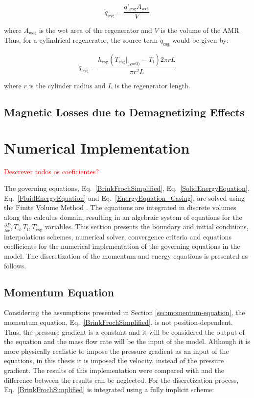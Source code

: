 \documentclass[review,preprint,12pt]{elsarticle}
\begin{document}
\begin{equation}
\dot{q}_\textrm{csg} = \frac{q\textrm{"}_\textrm{csg}A_\textrm{wet}}{V}
\label{Q_csg}
\end{equation}

\noindent where $A_\textrm{wet}$ is the wet area of the regenerator and $V$ is the volume of the AMR. Thus, for a cylindrical regenerator, the source term $\dot{q}_\textrm{csg}$ would be given by:

\begin{equation}
\dot{q}_\textrm{csg} = \frac{ h_\textrm{csg}(T_\textrm{csg}|_\textrm{(y=0)} - T_\textrm{f})2\pi rL}{\pi r^2L}
\label{Q_csg_cylindrical}
\end{equation}

\noindent where $r$ is the cylinder radius and $L$ is the regenerator length.


\subsection{Magnetic Losses due to Demagnetizing Effects}

\section{Numerical Implementation}
\textcolor{red}{Descrever todos os coeficientes?}

The governing equations, Eq.~\eqref{BrinkFrochSimplified}, Eq.~\eqref{SolidEnergyEquation}, Eq.~\eqref{FluidEnergyEquation} and  Eq.~\eqref{EnergyEquation_Casing}, are solved using the Finite Volume Method \cite{Patankar1980,Maliska2004}. The equations are integrated in discrete volumes along the calculus domain, resulting in an algebraic system of equations for the $\frac{\partial P}{\partial x}, T_\textrm{s}, T_\textrm{f}, T_\textrm{csg}$ variables. This section presents the boundary and initial conditions, interpolations schemes, numerical solver, convergence criteria and equations coefficients for the numerical implementation of the governing equations in the model. The discretization of the momentum and energy equations is presented as follows.

\subsection{Momentum Equation}
\label{sec:disc-momentum}

Considering the assumptions presented in Section \ref{sec:momentum-equation}, the momentum equation, Eq.~\eqref{BrinkFrochSimplified}, is not position-dependent. Thus, the pressure gradient is a constant and it will be considered the output of the equation and the mass flow rate will be the input of the model. Although it is more physically realistic to impose the pressure gradient as an input of the equations, in this thesis it is imposed the velocity, instead of the pressure gradient. The results of this implementation were compared with \cite{Trevizoli2015} and the difference between the results can be neglected. For the discretization process, Eq.~\eqref{BrinkFrochSimplified} is integrated using a fully implicit scheme:
\end{document}
